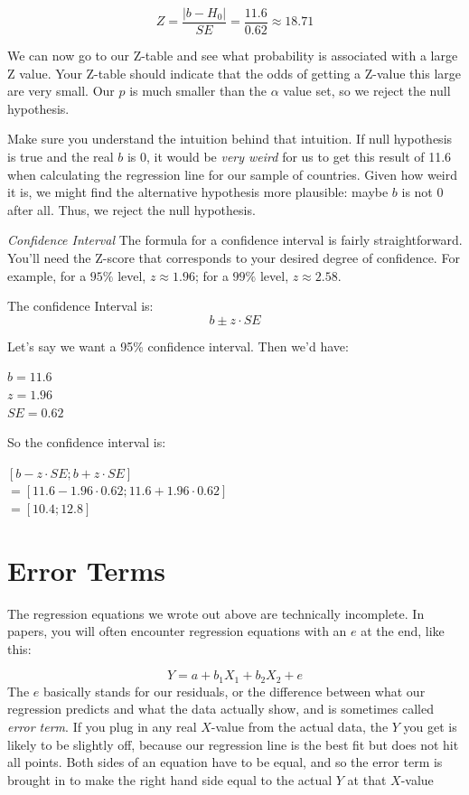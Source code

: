 \documentclass{book}
\begin{document}
\[Z = \frac{|b-H_0|}{SE} = \frac{11.6}{0.62} \approx 18.71\]

We can now go to our Z-table and see what probability is associated with a
large Z value. Your Z-table should indicate that the odds of getting a Z-value
this large are very small. Our \(p\) is much smaller than the \(\alpha\) value
set, so we reject the null hypothesis.

Make sure you understand the intuition behind that intuition. If null
hypothesis is true and the real \(b\) is 0, it would be \emph{very weird} for
us to get this result of 11.6 when calculating the regression line for our
sample of countries. Given how weird it is, we might find the alternative
hypothesis more plausible: maybe \(b\) is not \(0\) after all. Thus, we reject
the null hypothesis.

\emph{Confidence Interval} The formula for a confidence interval is fairly
straightforward. You'll need the Z-score that corresponds to your desired
degree of confidence. For example, for a \(95\%\) level, \(z\approx1.96\); for
a \(99\%\) level, \(z\approx 2.58\).

The confidence Interval is: \[b \pm z \cdot SE\]

Let's say we want a 95\% confidence interval. Then we'd have:

\(b = 11.6\)\\
\(z = 1.96\)\\
\(SE = 0.62\)

So the confidence interval is:

\([b - z \cdot SE ; b + z\cdot SE]\)\\
\(= [11.6 - 1.96 \cdot 0.62 ; 11.6 + 1.96 \cdot 0.62 ]\)\\
\(= [10.4; 12.8]\)

\hypertarget{error-terms}{%
\section{Error Terms}\label{error-terms}}

The regression equations we wrote out above are technically incomplete. In
papers, you will often encounter regression equations with an \(e\) at the
end, like this:

\[Y = a + b_{1}X_{1} + b_{2}X_{2} + e\] The \(e\) basically stands for our
residuals, or the difference between what our regression predicts and what the
data actually show, and is sometimes called \emph{error term}. If you plug in
any real \(X\)-value from the actual data, the \(Y\) you get is likely to be
slightly off, because our regression line is the best fit but does not hit all
points. Both sides of an equation have to be equal, and so the error term is
brought in to make the right hand side equal to the actual \(Y\) at that
\(X\)-value
\end{document}
